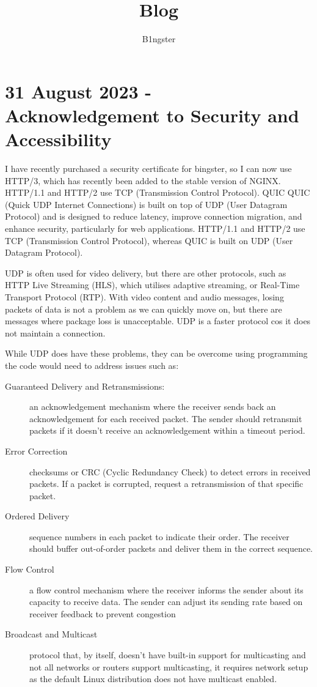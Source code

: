 \documentclass{article}
\title{Blog}
\author{B1ngster}
\date{}
\begin{document}
\maketitle
\newpage


\tableofcontents
\newpage


\section*{31 August 2023 - \\ Acknowledgement to Security and Accessibility}

I have recently purchased a security certificate for bingster, so I can now use HTTP/3, which has recently been added to the stable version of NGINX.   HTTP/1.1 and HTTP/2 use TCP (Transmission Control Protocol). QUIC QUIC (Quick UDP Internet Connections)  is built on top of UDP (User Datagram Protocol) and is designed to reduce latency, improve connection migration, and enhance security, particularly for web applications. HTTP/1.1 and HTTP/2 use TCP (Transmission Control Protocol), whereas QUIC is built on UDP (User Datagram Protocol). 

UDP is often used for video delivery, but there are other protocols, such as HTTP Live Streaming (HLS), which utilises adaptive streaming, or Real-Time Transport Protocol (RTP). With video content and audio messages, losing packets of data is not a problem as we can quickly move on, but there are messages where package loss is unacceptable. UDP is a faster protocol cos it does not maintain a connection. 

While UDP does have these problems, they can be overcome using programming the code would need to address issues such as:

\begin{description}
\item[Guaranteed Delivery and Retransmissions:] an acknowledgement mechanism where the receiver sends back an acknowledgement for each received packet. The sender should retransmit packets if it doesn't receive an acknowledgement within a timeout period.
\item[Error Correction] checksums or CRC (Cyclic Redundancy Check) to detect errors in received packets. If a packet is corrupted, request a retransmission of that specific packet.
\item[Ordered Delivery] sequence numbers in each packet to indicate their order. The receiver should buffer out-of-order packets and deliver them in the correct sequence.
\item[Flow Control]a flow control mechanism where the receiver informs the sender about its capacity to receive data. The sender can adjust its sending rate based on receiver feedback to prevent congestion 
\item[Broadcast and Multicast]  protocol that, by itself, doesn't have built-in support for multicasting and not all networks or routers support multicasting, it requires network setup as the default Linux distribution does not have multicast enabled.
\end{description}
\end{document}
